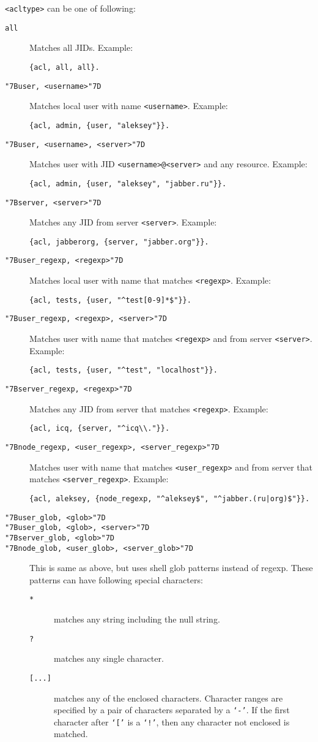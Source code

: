 \documentclass[a4paper,10pt]{article}
\newcommand{\bracehack}{\def\{{\char"7B}\def\}{\char"7D}}
\newcommand{\term}[1]{\texttt{#1}}
\newcommand{\titem}[1]{\item[\bracehack\texttt{#1}]}
\begin{document}
\term{<acltype>} can be one of following:
\begin{description}
\titem{all} Matches all JIDs.  Example:
\begin{verbatim}
{acl, all, all}.
\end{verbatim}
\titem{\{user, <username>\}} Matches local user with name
  \term{<username>}.  Example:
\begin{verbatim}
{acl, admin, {user, "aleksey"}}.
\end{verbatim}
\titem{\{user, <username>, <server>\}} Matches user with JID
  \term{<username>@<server>} and any resource.  Example:
\begin{verbatim}
{acl, admin, {user, "aleksey", "jabber.ru"}}.
\end{verbatim}
\titem{\{server, <server>\}} Matches any JID from server
  \term{<server>}.  Example:
\begin{verbatim}
{acl, jabberorg, {server, "jabber.org"}}.
\end{verbatim}
\titem{\{user\_regexp, <regexp>\}} Matches local user with name that
  matches \term{<regexp>}.  Example:
\begin{verbatim}
{acl, tests, {user, "^test[0-9]*$"}}.
\end{verbatim}
\titem{\{user\_regexp, <regexp>, <server>\}} Matches user with name
  that matches \term{<regexp>} and from server \term{<server>}.  Example:
\begin{verbatim}
{acl, tests, {user, "^test", "localhost"}}.
\end{verbatim}
\titem{\{server\_regexp, <regexp>\}} Matches any JID from server that
  matches \term{<regexp>}.  Example:
\begin{verbatim}
{acl, icq, {server, "^icq\\."}}.
\end{verbatim}
\titem{\{node\_regexp, <user\_regexp>, <server\_regexp>\}} Matches user
  with name that matches \term{<user\_regexp>} and from server that matches
  \term{<server\_regexp>}.  Example:
\begin{verbatim}
{acl, aleksey, {node_regexp, "^aleksey$", "^jabber.(ru|org)$"}}.
\end{verbatim}
\titem{\{user\_glob, <glob>\}}
\titem{\{user\_glob, <glob>, <server>\}}
\titem{\{server\_glob, <glob>\}}
\titem{\{node\_glob, <user\_glob>, <server\_glob>\}} This is same as
  above, but uses shell glob patterns instead of regexp.  These patterns can
  have following special characters:
  \begin{description}
  \titem{*} matches any string including the null string.
  \titem{?} matches any single character.
  \titem{[...]} matches any of the enclosed characters.  Character
    ranges are specified by a pair of characters separated by a \term{`-'}.
    If the first character after \term{`['} is a \term{`!'}, then any
    character not enclosed is matched.
  \end{description}
\end{description}
\end{document}
